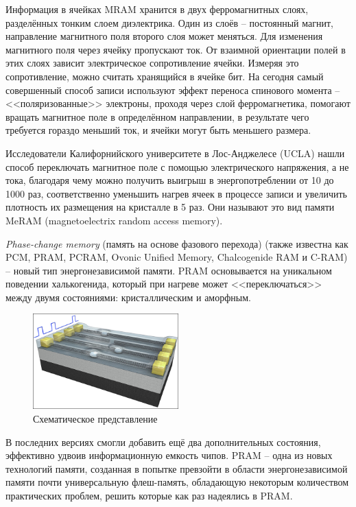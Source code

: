 Информация в ячейках MRAM хранится в двух ферромагнитных слоях, 
разделённых тонким слоем диэлектрика. Один из слоёв -- постоянный магнит, 
направление магнитного поля второго слоя может меняться. Для изменения 
магнитного поля через ячейку пропускают ток. От взаимной ориентации полей в 
этих слоях зависит электрическое сопротивление ячейки. Измеряя это 
сопротивление, можно считать хранящийся в ячейке бит. На сегодня самый 
совершенный способ записи используют эффект переноса спинового момента -- 
<<поляризованные>> электроны, проходя через слой ферромагнетика, помогают 
вращать магнитное поле в определённом направлении, в результате чего 
требуется гораздо меньший ток, и ячейки могут быть меньшего размера.

Исследователи Калифорнийского университете в Лос-Анджелесе (UCLA) нашли 
способ переключать магнитное поле с помощью электрического напряжения, а 
не тока, благодаря чему можно получить выигрыш в энергопотреблении от 
10 до 1000 раз, соответственно уменьшить нагрев ячеек в процессе записи 
и увеличить плотность их размещения на кристалле в 5 раз. Они называют 
это вид памяти MeRAM (magnetoelectrix random access memory).

\pagebreak

\emph{Phase-change memory} (память на основе фазового перехода) 
(также известна как PCM, PRAM, PCRAM, Ovonic Unified Memory, 
Chalcogenide RAM и C-RAM) -- новый тип энергонезависимой памяти. 
PRAM основывается на уникальном поведении халькогенида, который при 
нагреве может <<переключаться>> между двумя состояниями: кристаллическим 
и аморфным. 

\begin{figure}
    \vspace{-2ex}
    \includegraphics[width=0.5\textwidth]{images/image_04}
    \parbox{0.5\textwidth}{\caption{Схематическое представление}}
\end{figure}

В последних версиях смогли добавить ещё два дополнительных 
состояния, эффективно удвоив информационную емкость чипов. PRAM -- одна из
новых технологий памяти, созданная в попытке превзойти в области 
энергонезависимой памяти почти универсальную флеш-память, обладающую некоторым 
количеством практических проблем, решить которые как раз надеялись в PRAM.

